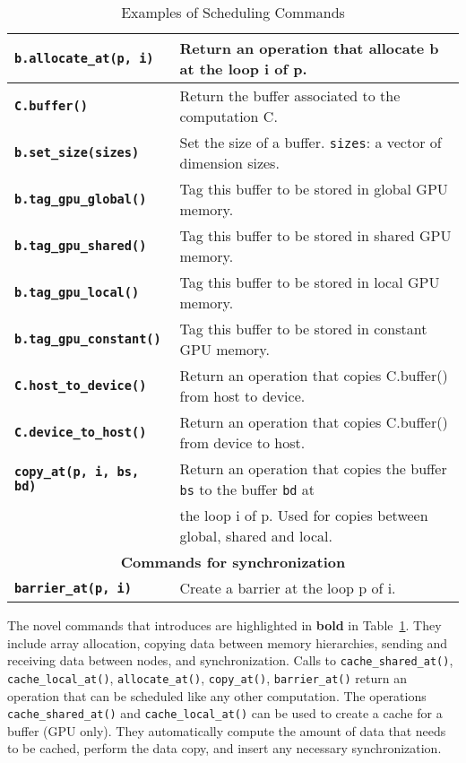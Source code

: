 \begin{table}[t]
\begin{tabular}{l|l}
        \texttt{\textbf{b.allocate\_at(p, i)}} & Return an operation that allocate b at the loop i of p.\\\hline
        \texttt{\textbf{C.buffer()}} & Return the buffer associated to the computation C.\\\hline
        \texttt{\textbf{b.set\_size(sizes)}} & Set the size of a buffer. \texttt{sizes}: a vector of dimension sizes.\\\hline
        \texttt{\textbf{b.tag\_gpu\_global()}} & Tag this buffer to be stored in global GPU memory.\\\hline
        \texttt{\textbf{b.tag\_gpu\_shared()}} & Tag this buffer to be stored in shared GPU memory.\\\hline
        \texttt{\textbf{b.tag\_gpu\_local()}} & Tag this buffer to be stored in local GPU memory.\\\hline
        \texttt{\textbf{b.tag\_gpu\_constant()}} & Tag this buffer to be stored in constant GPU memory.\\\hline
        \texttt{\textbf{C.host\_to\_device()}} & Return an operation that copies C.buffer() from host to device.\\\hline
        \texttt{\textbf{C.device\_to\_host()}} & Return an operation that copies C.buffer() from device to host.\\\hline
        \texttt{\textbf{copy\_at(p, i, bs, bd)}}
            & Return an operation that copies the buffer \texttt{bs} to the buffer \texttt{bd} at\\
            & the loop i of p.
            Used for copies between global, shared and local.
        \\\hline
        \multicolumn{2}{c}{\textbf{Commands for synchronization}} \\\hline
        \texttt{\textbf{barrier\_at(p, i)}}
            & Create a barrier at the loop p of i.
        \\\hline
    \end{tabular}
    \caption{Examples of \framework{} Scheduling Commands}
    \label{tab:scheduling}
    \vspace{-0.75cm}
\end{table}

The novel commands that \framework introduces are highlighted in \textbf{bold} in Table~\ref{tab:scheduling}.  They include array allocation, copying data between memory hierarchies, sending and receiving data between nodes, and synchronization.  Calls to \texttt{cache\_shared\_at()}, \texttt{cache\_local\_at()}, \texttt{allocate\_at()}, \texttt{copy\_at()}, \texttt{barrier\_at()} return an operation that can be scheduled like any other computation.
The operations \\ \texttt{cache\_shared\_at()} and \texttt{cache\_local\_at()} can be used to create a cache for a buffer (GPU only).  They automatically compute the amount of data that needs to be cached, perform the data copy, and insert any necessary synchronization.

